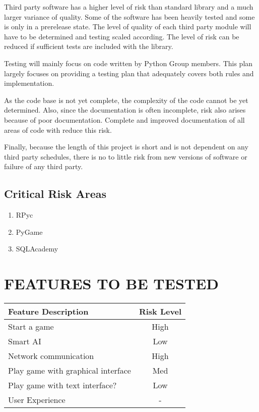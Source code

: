 \documentclass[report]{article}
\begin{document}
Third party software has a higher level of risk than standard library and a much larger variance of quality. Some of the software has been heavily tested and some is only in a prerelease state. The level of quality of each third party module will have to be determined and testing scaled according. The level of risk can be reduced if sufficient tests are included with the library.

Testing will mainly focus on code written by Python Group members. This plan largely focuses on providing a testing plan that adequately covers both rules and implementation.

As the code base is not yet complete, the complexity of the code cannot be yet determined. Also, since the documentation is often incomplete, risk also arises because of poor documentation. Complete and improved documentation of all areas of code with reduce this risk.

Finally, because the length of this project is short and is not dependent on any third party schedules, there is no to little risk from new versions of software or failure of any third party.

\subsection{Critical Risk Areas}
\begin{enumerate}
\item RPyc
\item PyGame
\item SQLAcademy
\end{enumerate} 

\section[FEATURES TO BE TESTED]{FEATURES TO BE TESTED}
\begin{center}
\begin{tabularx}{\textwidth}{| X | c |}
  \hline
  \textbf{Feature Description} &
    \textbf{Risk Level} 
\\ \hline
Start a game & High
\\ \hline
Smart AI & Low
\\ \hline
Network communication & High
\\ \hline
Play game with graphical interface & Med
\\ \hline
Play game with text interface? & Low
\\ \hline
User Experience & -
\\ \hline
\end{tabularx}
\end{center}
\end{document}
